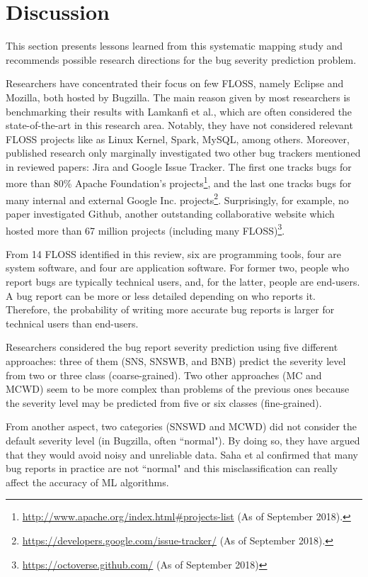 \section{Discussion}\label{sec:discussion}
This section presents lessons learned from this systematic mapping study and recommends possible research directions for the bug severity prediction problem.

Researchers have concentrated their focus on few FLOSS, namely Eclipse and Mozilla, both hosted by Bugzilla. The main reason given by most researchers is benchmarking their results with Lamkanfi et al.\cite{Lamkanfi:2010, Lamkanfi:2011}, which are often considered the state-of-the-art in this research area. Notably, they have not considered relevant FLOSS projects like as Linux Kernel, Spark, MySQL, among others. Moreover, published research only marginally investigated two other bug trackers mentioned in reviewed papers: Jira and Google Issue Tracker. The first one tracks bugs for more than 80\% Apache Foundation's projects\footnote[18]{\url{http://www.apache.org/index.html\#projects-list} (As of September 2018).}, and the last one tracks bugs for many internal and external Google Inc. projects\footnote[19]{\url{https://developers.google.com/issue-tracker/} (As of September 2018).}. Surprisingly, for example, no paper investigated Github, another outstanding collaborative website which hosted more than 67 million projects (including many FLOSS)\footnote[20]{\url{https://octoverse.github.com/} (As of September 2018)}.

From 14 FLOSS identified in this review, six are programming tools, four are system software, and four are application software. For former two, people who report bugs are typically technical users, and, for the latter, people are end-users. A bug report can be more or less detailed depending on who reports it\cite{Lamkanfi:2010}\cite{Lamkanfi:2011}. Therefore, the probability of writing more accurate bug reports is larger for technical users than end-users. 

Researchers considered the bug report severity prediction using five different approaches: three of them (SNS, SNSWB, and BNB) predict the severity level from two or three class (coarse-grained). Two other approaches (MC and MCWD) seem to be more complex than problems of the previous ones because the severity level may be predicted from five or six classes (fine-grained). 

From another aspect, two categories (SNSWD and MCWD) did not consider the default severity level (in Bugzilla, often ``normal"). By doing so, they have argued that they would avoid noisy and unreliable data. Saha et al\cite{Saha:2015} confirmed that many bug reports in practice are not ``normal" and this misclassification can really affect the accuracy of ML algorithms.


